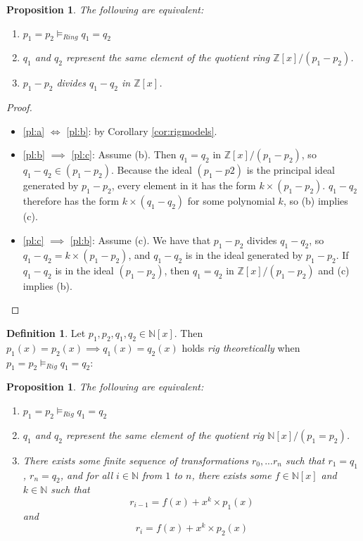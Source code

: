 \documentclass{msthesis}
\newtheorem{prop}[theorem]{Proposition}
\theoremstyle{definition}
\newtheorem{definition}[theorem]{Definition}
\newcommand{\ints}{\mathbb{Z}}
\newcommand{\nat}{\mathbb{N}}
\begin{document}
\begin{prop}
    The following are equivalent:
    \begin{enumerate}[label=(\alph*),nosep]
    \item \label{pl:a} $p_1 = p_2 \models_{Ring} q_1 = q_2$
    \item \label{pl:b} $q_1$ and $q_2$ represent the same element of the quotient ring $\ints[x]/(p_1-p_2)$.
    \item \label{pl:c} $p_1 - p_2$ divides $q_1 - q_2$ in $\ints[x]$.
    \end{enumerate}
\end{prop}
\begin{proof} \hfill
\begin{itemize}[nosep]
\item \ref{pl:a} $\iff$ \ref{pl:b}: by Corollary \ref{cor:rigmodels}.
\item \ref{pl:b} $\implies$ \ref{pl:c}:
     Assume (b).  Then $q_1 = q_2$ in $\ints[x]/(p_1 - p_2)$, so $q_1 - q_2 \in (p_1 - p_2)$.  Because the ideal $(p_1 - p2)$ is the principal ideal generated by $p_1 - p_2$, every element in it has the form $k \times (p_1 - p_2)$. $q_1 - q_2$ therefore has the form $k \times (q_1 - q_2)$ for some polynomial $k$, so (b) implies (c).
\item \ref{pl:c} $\implies$ \ref{pl:b}:
     Assume (c). We have that $p_1 - p_2$ divides $q_1 - q_2$, so $q_1 - q_2 = k \times (p_1 - p_2)$, and $q_1 - q_2$ is in the ideal generated by $p_1 - p_2$. If $q_1 - q_2$ is in the ideal $(p_1 - p_2)$, then $q_1 = q_2$ in $\ints[x]/(p_1 - p_2)$ and (c) implies (b).
\end{itemize}
\end{proof}

\begin{definition}\label{def:rigtheoretic}
Let $p_1, p_2, q_1, q_2 \in \nat[x]$.  Then $p_1(x) = p_2(x) \implies q_1(x) = q_2(x)$ holds \textit{rig theoretically} when $p_1 = p_2 \models_{Rig} q_1 = q_2$:
\end{definition}

\begin{prop}
    The following are equivalent:
    \begin{enumerate}[label=(\alph*),nosep]
    \item \label{pl2:a} $p_1 = p_2 \models_{Rig} q_1 = q_2$
    \item \label{pl2:b} $q_1$ and $q_2$ represent the same element of the quotient rig $\nat[x]/(p_1=p_2)$.
    \item \label{pl2:c} There exists some finite sequence of transformations $r_0, ... r_n$ such that $r_1 = q_1$, $r_n = q_2$, and for all $i \in \nat$ from $1$ to $n$, there exists some $f \in \nat[x]$ and $k \in \nat$ such that \[ r_{i-1} = f(x) + x^k\times p_1(x) \]
    and
    \[ r_i = f(x) + x^k \times p_2(x) \]
\end{enumerate}
\end{prop}
\end{document}
